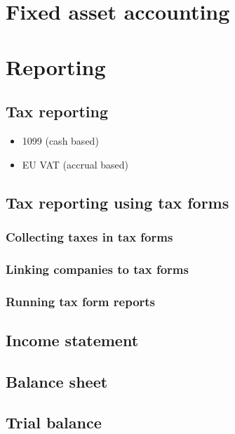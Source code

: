 


\section{Fixed asset accounting}
\label{sec-business-processes-accounting-fixed-asset-accounting}



\section{Reporting}
\label{sec-business-processes-accounting-reporting}

\subsection{Tax reporting}
\label{subsec-business-processes-accounting-reporting-tax}


\begin{itemize}
\item 1099 (cash based)
\item EU \gls{VAT} (accrual based)
\end{itemize}


\subsection{Tax reporting using tax forms}
\label{subsec-business-processes-accounting-reporting-tax-with-taxforms}

\subsubsection{Collecting taxes in tax forms}
\label{subsubsec-business-processes-accounting-reporting-tax-collecting-taxforms}

\subsubsection{Linking companies to tax forms}
\label{subsubsec-business-processes-accounting-reporting-tax-linking-taxforms}

\subsubsection{Running tax form reports}
\label{subsubsec-business-processes-accounting-reporting-tax-running-taxforms}


\subsection{Income statement}
\label{subsec-business-processes-accounting-reporting-result}


\subsection{Balance sheet}
\label{subsec-business-processes-accounting-reporting-balance}

\subsection{Trial balance}
\label{subsec-business-processes-accounting-reporting-trial-balance}

